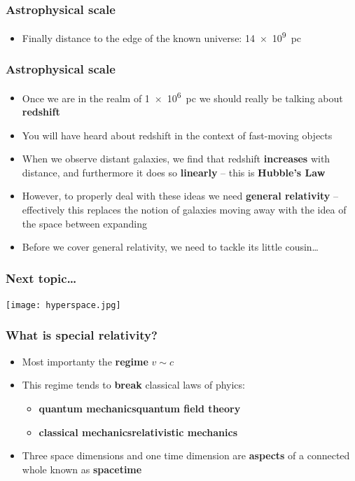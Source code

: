 \documentclass{beamer}
\begin{document}
\begin{frame}
  \frametitle{Astrophysical scale}
  \begin{itemize}
    \item Finally distance to the edge of the known universe: \SI{14e9}{pc}
  \end{itemize}
\end{frame}

\begin{frame}
  \frametitle{Astrophysical scale}
  \begin{itemize}
    \item Once we are in the realm of \SI{1e6}{pc} we should really be talking about \textbf{redshift}
    \item You will have heard about redshift in the context of fast-moving objects
    \item When we observe distant galaxies, we find that redshift \textbf{increases} with distance, and furthermore it does so \textbf{linearly} -- this is \textbf{Hubble's Law}
    \item However, to properly deal with these ideas we need \textbf{general relativity} -- effectively this replaces the notion of galaxies moving away with the idea of the space between expanding
    \item Before we cover general relativity, we need to tackle its little cousin\ldots
  \end{itemize}
\end{frame}

\begin{frame}
  \frametitle{Next topic\ldots}
  \center
  \texttt{[image: hyperspace.jpg]}
\end{frame}
 
\begin{frame}
  \frametitle{What is special relativity?}
  \begin{itemize}
    \item<1-> Most importanty the \textbf{regime} $v\sim c$
    \item<2-> This regime tends to \textbf{break} classical laws of phyics:
      \begin{itemize}
	\item<3-> \textbf{quantum mechanics}\to\textbf{quantum field theory}
	\item<4-> \textbf{classical mechanics}\to\textbf{relativistic mechanics}
      \end{itemize}
    \item<5-> Three space dimensions and one time dimension are \textbf{aspects} of a connected whole known as \textbf{spacetime}
  \end{itemize}
\end{frame}
\end{document}
